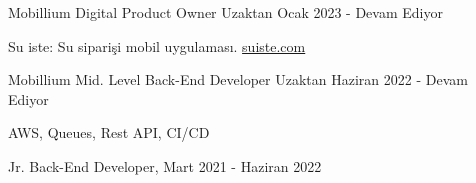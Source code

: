 
\begin{cventries}
  \cventry
    {Mobillium} %
    {Digital Product Owner} %
    {Uzaktan} %
    {Ocak 2023 - Devam Ediyor} %
    {
      \begin{cvitems} %
        \item Su iste: Su siparişi mobil uygulaması. {\href{https://suiste.com}{suiste.com}}
      \end{cvitems}
    }
  \cventry
    {Mobillium} %
    {Mid. Level Back-End Developer} %
    {Uzaktan} %
    {Haziran 2022 - Devam Ediyor} %
    {
      \begin{cvitems} %
        \item AWS, Queues, Rest API, CI/CD
      	\item Jr. Back-End Developer, Mart 2021 - Haziran 2022
      \end{cvitems}
    }

\end{cventries}
